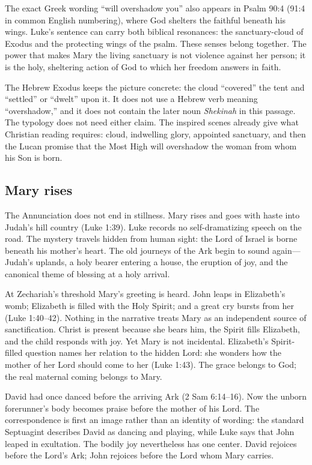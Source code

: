 The exact Greek wording ``will overshadow you'' also appears in Psalm 90:4
(91:4 in common English numbering), where God shelters the faithful beneath
his wings.  Luke's sentence can carry both biblical resonances: the
sanctuary-cloud of Exodus and the protecting wings of the psalm.  These senses
belong together.  The power that makes Mary the living sanctuary is not
violence against her person; it is the holy, sheltering action of God to which
her freedom answers in faith.

The Hebrew Exodus keeps the picture concrete: the cloud ``covered'' the tent
and ``settled'' or ``dwelt'' upon it.  It does not use a Hebrew verb meaning
``overshadow,'' and it does not contain the later noun \emph{Shekinah} in this
passage.  The typology does not need either claim.  The inspired scenes already
give what Christian reading requires: cloud, indwelling glory, appointed
sanctuary, and then the Lucan promise that the Most High will overshadow the
woman from whom his Son is born.

\subsection{Mary rises}

The Annunciation does not end in stillness.  Mary rises and goes with haste
into Judah's hill country (Luke 1:39).  Luke records no self-dramatizing speech
on the road.  The mystery travels hidden from human sight: the Lord of Israel
is borne beneath his mother's heart.  The old journeys of the Ark begin to
sound again---Judah's uplands, a holy bearer entering a house, the eruption of
joy, and the canonical theme of blessing at a holy arrival.

At Zechariah's threshold Mary's greeting is heard.  John leaps in Elizabeth's
womb; Elizabeth is filled with the Holy Spirit; and a great cry bursts from
her (Luke 1:40--42).  Nothing in the narrative treats Mary as an independent
source of sanctification.  Christ is present because she bears him, the Spirit
fills Elizabeth, and the child responds with joy.  Yet Mary is not incidental.
Elizabeth's Spirit-filled question names her relation to the hidden Lord: she
wonders how the mother of her Lord should come to her (Luke 1:43).  The grace
belongs to God; the real maternal coming belongs to Mary.

David had once danced before the arriving Ark (2 Sam 6:14--16).  Now the
unborn forerunner's body becomes praise before the mother of his Lord.  The
correspondence is first an image rather than an identity of wording: the
standard Septuagint describes David as dancing and playing, while Luke says
that John leaped in exultation.  The bodily joy nevertheless has one center.
David rejoices before the Lord's Ark; John rejoices before the Lord whom Mary
carries.

